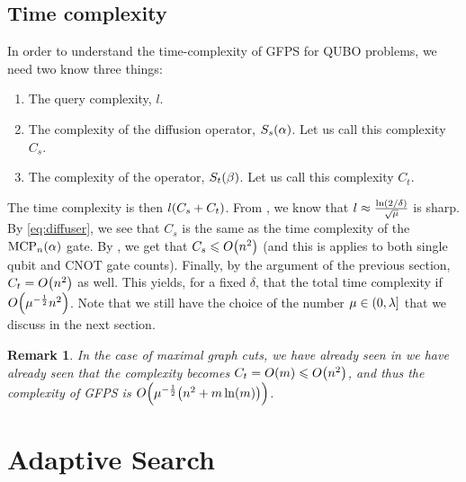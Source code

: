 \documentclass[reqno, 10pt]{amsart}
\numberwithin{equation}{section}                %
\let\originalleft\left
\let\originalright\right
\renewcommand{\left}{\mathopen{}\mathclose\bgroup\originalleft}
\renewcommand{\right}{\aftergroup\egroup\originalright}
\def\({\mathopen{}\left(}
\def\){\right)\mathclose{}}
\newtheorem{remark}[theorem]{Remark}
\begin{document}
\bigskip

\subsection{Time complexity}
\label{sec:time}

In order to understand the time-complexity of GFPS for QUBO problems, we need two know three things:
\begin{enumerate}

   \item The query complexity, $l$.

   \item The complexity of the diffusion operator, $S_s \( \alpha \)$. Let us call this complexity $C_s$.

   \item The complexity of the operator, $S_t \( \beta \)$. Let us call this complexity $C_t$.

\end{enumerate}

The time complexity is then $l \( C_s + C_t \)$. From \cite{yoder_fixed_2014}, we know that $l \approx \tfrac{\ln \( 2 / \delta \)}{\sqrt{\mu}}$ is sharp. By \cref{eq:diffuser}, we see that $C_s$ is the same as the time complexity of the $\mathrm{MCP}_n \( \alpha \)$ gate. By \cite{linear_dasilva_2022}, we get that $C_s \leqslant O \( n^2 \)$ (and this is applies to both single qubit and CNOT gate counts). Finally, by the argument of the previous section, $C_t = O \( n^2 \)$ as well. This yields, for a fixed $\delta$, that the total time complexity if $O \( \mu^{- \frac{1}{2}} n^2 \)$. Note that we still have the choice of the number $\mu \in \( 0, \lambda \right]$ that we discuss in the next section.

\begin{remark}
   In the case of maximal graph cuts, we have already seen in  we have already seen that the complexity becomes $C_t = O \( m \) \leqslant O \( n^2 \)$, and thus the complexity of GFPS is $O \( \mu^{- \frac{1}{2}} \( n^2 + m \ln(m) \) \)$.
\end{remark}

\bigskip

\section{Adaptive Search}
\label{sec:adaptive}
\end{document}
